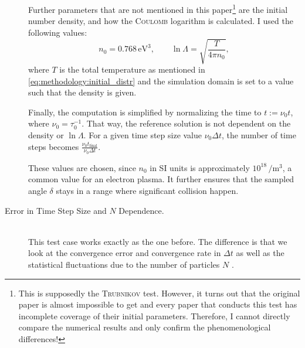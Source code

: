 \begin{description}
    Further parameters that are not mentioned in this paper\footnote{This is supposedly the \textsc{Trubnikov} test. However, it turns out that the original paper is almost impossible to get and every paper that conducts this test has incomplete coverage of their initial parameters. Therefore, I cannot directly compare the numerical results and only confirm the phenomenological differences!} are the initial number density, and how the \textsc{Coulomb} logarithm is calculated. I used the following values:
    \begin{equation*}
        n_0 = 0.768 \,\si{\electronvolt\cubed},
        \qquad \ln\Lambda = \sqrt{\frac{T}{4 \pi n_0}} ,
    \end{equation*}
    where $T$ is the total temperature as mentioned in \eqref{eq:methodology:initial_distr} and the simulation domain is set to a value such that the density is given. 

    Finally, the computation is simplified by normalizing the time to $t := \nu_0t$, where $\nu_0 = \tau_0^{-1}$. That way, the reference solution is not dependent on the density or $\ln\Lambda$. For a given time step size value $\nu_0\Delta t$, the number of time steps becomes $\frac{\nu_0 t_\mathrm{final}}{\nu_0\Delta t}$.

    These values are chosen, since $n_0$ in SI units is approximately $10^18\,\si{\per\metre\cubed}$, a common value for an electron plasma. It further ensures that the sampled angle $\delta$ stays in a range where significant collision happen.
    
    \item[Error in Time Step Size and $N$ Dependence.] \hfill \\
    This test case works exactly as the one before. The difference is that we look at the convergence error and convergence rate in $\Delta t$ \cite[4315--4318]{Wang2008} as well as the statistical fluctuations due to the number of particles $N$ \cite[4319--4320]{Wang2008}. 


\end{description}
